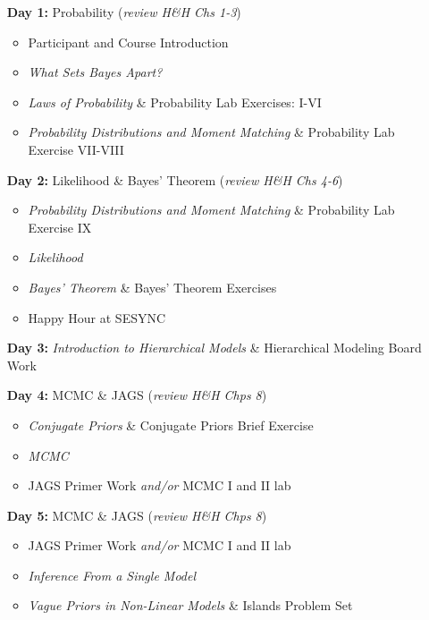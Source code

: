 \documentclass[11pt]{article}
\begin{document}
\begin{enumerate}
\item[\textbf{Day 1:}] Probability (\emph{review H\&H Chs 1-3})

\begin{itemize}
\item Participant and Course Introduction %
\item \emph{What Sets Bayes Apart?} %
\item \emph{Laws of Probability} \& Probability Lab Exercises: I-VI %
\item \emph{Probability Distributions and Moment Matching} \& Probability Lab Exercise VII-VIII %
\end{itemize}

\item[\textbf{Day 2:}] Likelihood \& Bayes' Theorem (\emph{review H\&H Chs 4-6})
\begin{itemize}
\item \emph{Probability Distributions and Moment Matching} \& Probability Lab Exercise IX %
\item \emph{Likelihood}  %
\item \emph{Bayes' Theorem}  \& Bayes' Theorem Exercises  %
\item Happy Hour at SESYNC 
\end{itemize}

\item [\textbf{Day 3:}]  \emph{Introduction to Hierarchical Models} \& Hierarchical Modeling Board Work  %

\item[\textbf{Day 4:}] MCMC \& JAGS (\emph{review H\&H Chps 8})
\begin{itemize}
\item \emph{Conjugate Priors} \& Conjugate Priors Brief Exercise 
\item \emph{MCMC} 
\item JAGS Primer Work \emph{and/or} MCMC I and II lab
\end{itemize}

\item[\textbf{Day 5:}] MCMC \& JAGS (\emph{review H\&H Chps 8})
\begin{itemize}
\item JAGS Primer Work \emph{and/or} MCMC I and II lab
\item \emph{Inference From a Single Model}  %
\item \emph{Vague Priors in Non-Linear Models} \& Islands Problem Set  %
\end{itemize}


\end{enumerate}
\end{document}
